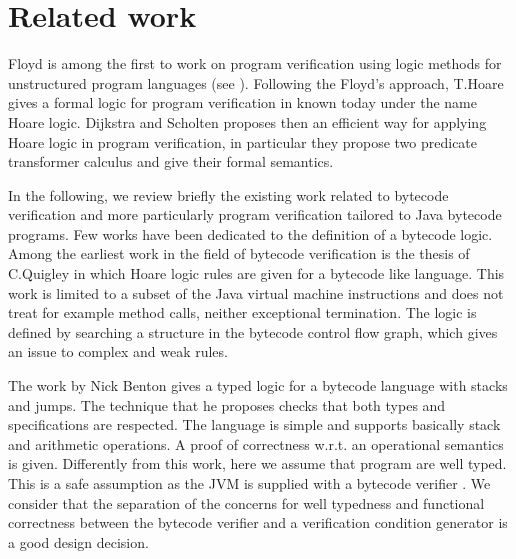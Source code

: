 \section{Related work} \label{relWorkWp}
 Floyd is among the first to work on program verification using logic methods for unstructured program
 languages (see \cite{F67amp}). Following the Floyd's approach, T.Hoare gives a formal logic for program verification in \cite{Hoare69ABC} known
 today under the name Hoare logic. Dijkstra and Scholten \cite{WPCDS} proposes then an efficient way for applying Hoare logic in
 program verification, in particular they propose two predicate transformer calculus and give their formal semantics. 
 
 
 
In the following, we review briefly the existing work related to bytecode verification
 and more particularly program verification tailored to Java bytecode programs. 
Few works have been dedicated to the definition of a bytecode logic. Among the earliest work in the field of bytecode verification 
is the thesis of C.Quigley  \cite{Quigley03PLJ} in which Hoare logic rules are given for a bytecode like language. This work is limited 
to a subset of the Java virtual machine instructions and does not treat for example method calls,
 neither exceptional termination. The logic is defined by searching a structure in the bytecode control flow graph,
 which gives an issue to complex and weak rules.

The work by Nick Benton \cite{B04tlsj} gives a  typed logic for a bytecode language with stacks and jumps. 
The technique that he proposes checks that both types and specifications are respected.
The language is simple and supports basically stack and arithmetic operations. A proof of correctness
w.r.t. an operational semantics is given. Differently from this work, here we assume that program are well typed. 
This is a safe assumption as the JVM is supplied with a bytecode verifier \cite{Ljbc}. 
We consider that the separation of the concerns for well typedness and functional correctness between the bytecode verifier
and a verification condition generator is a good design decision.

